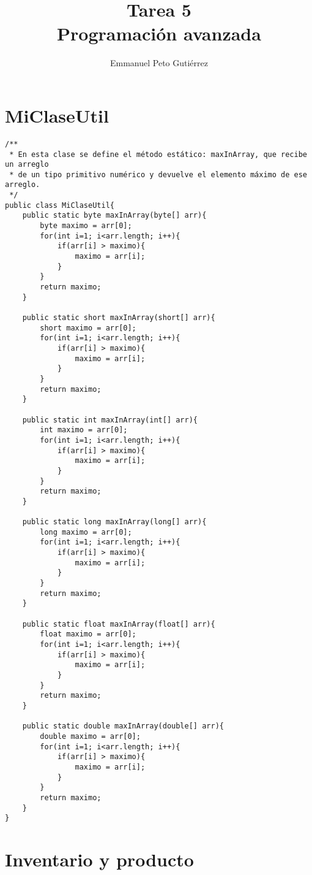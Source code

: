 \documentclass{article}
\title{Tarea 5\\Programación avanzada}
\author{Emmanuel Peto Gutiérrez}
\begin{document}
\maketitle

\section*{MiClaseUtil}

\begin{verbatim}
/**
 * En esta clase se define el método estático: maxInArray, que recibe un arreglo
 * de un tipo primitivo numérico y devuelve el elemento máximo de ese arreglo.
 */
public class MiClaseUtil{
    public static byte maxInArray(byte[] arr){
        byte maximo = arr[0];
        for(int i=1; i<arr.length; i++){
            if(arr[i] > maximo){
                maximo = arr[i];
            }
        }
        return maximo;
    }

    public static short maxInArray(short[] arr){
        short maximo = arr[0];
        for(int i=1; i<arr.length; i++){
            if(arr[i] > maximo){
                maximo = arr[i];
            }
        }
        return maximo;
    }

    public static int maxInArray(int[] arr){
        int maximo = arr[0];
        for(int i=1; i<arr.length; i++){
            if(arr[i] > maximo){
                maximo = arr[i];
            }
        }
        return maximo;
    }

    public static long maxInArray(long[] arr){
        long maximo = arr[0];
        for(int i=1; i<arr.length; i++){
            if(arr[i] > maximo){
                maximo = arr[i];
            }
        }
        return maximo;
    }

    public static float maxInArray(float[] arr){
        float maximo = arr[0];
        for(int i=1; i<arr.length; i++){
            if(arr[i] > maximo){
                maximo = arr[i];
            }
        }
        return maximo;
    }

    public static double maxInArray(double[] arr){
        double maximo = arr[0];
        for(int i=1; i<arr.length; i++){
            if(arr[i] > maximo){
                maximo = arr[i];
            }
        }
        return maximo;
    }
}
\end{verbatim}

\section*{Inventario y producto}
\end{document}
